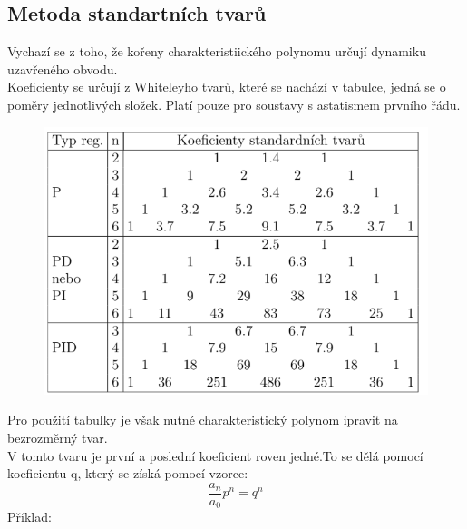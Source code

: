 \subsection*{Metoda standartních tvarů}
Vychazí se z toho, že kořeny charakteristiického polynomu určují dynamiku uzavřeného obvodu.\\
Koeficienty se určují z Whiteleyho tvarů, které se nachází v tabulce, jedná se o poměry jednotlivých složek. Platí pouze pro soustavy s astatismem prvního řádu.\\
\begin{figure}[H]
    \centering
    \includegraphics*[scale = 0.8]{images/metodaStandartnichTvaru.png}
\end{figure}
Pro použití tabulky je však nutné charakteristický polynom ipravit na bezrozměrný tvar.\\
V tomto tvaru je první a poslední koeficient roven jedné.To se dělá pomocí koeficientu q, který se získá pomocí vzorce:
\begin{equation}
    \frac{a_n}{a_0}p^n = q^n
\end{equation}
Příklad:\\
